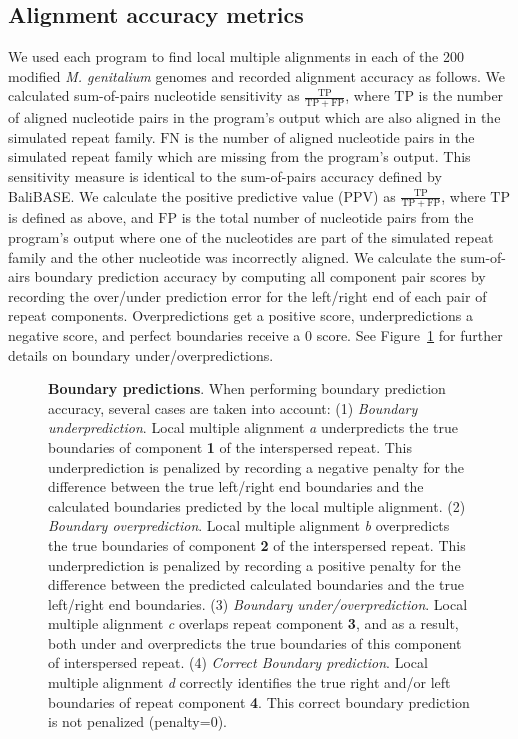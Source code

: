 \documentclass{llncs}
\begin{document}
\subsection{Alignment accuracy metrics}
\label{sec:metrics}
We used each program to find local multiple alignments in each of the
200 modified \emph{M. genitalium} genomes and recorded alignment
accuracy as follows. We calculated sum-of-pairs nucleotide sensitivity
as $\frac{\mathrm{TP}}{\mathrm{TP} + \mathrm{FP}}$, where
$\mathrm{TP}$ is the number of aligned nucleotide pairs in the
program's output which are also aligned in the simulated repeat
family.  $\mathrm{FN}$ is the number of aligned nucleotide pairs in
the simulated repeat family which are missing from the program's
output.  This sensitivity measure is identical to the sum-of-pairs
accuracy defined by BaliBASE\cite{ref-balibase}.  We calculate the
positive predictive value (PPV) as $\frac{\mathrm{TP}}{\mathrm{TP} +
\mathrm{FP}}$, where $\mathrm{TP}$ is defined as above, and
$\mathrm{FP}$ is the total number of nucleotide pairs from the
program's output where one of the nucleotides are part of the
simulated repeat family and the other nucleotide was incorrectly
aligned. We calculate the sum-of-airs boundary prediction accuracy by
computing all component pair scores by recording the over/under prediction
error for the left/right end of each pair of repeat components. Overpredictions get a positive score, underpredictions
a negative score, and perfect boundaries receive a 0 score. See Figure~\ref{fig-overunder} for
further details on boundary under/overpredictions.

\begin{figure}[t]
\centering
{}
\caption{\textbf{Boundary predictions}. When performing boundary prediction accuracy, several cases are
taken into account: (1) \emph{Boundary underprediction}. Local multiple alignment \emph{a} underpredicts the true boundaries
of component \textbf{1} of the interspersed repeat. This underprediction is penalized by recording a negative penalty for the difference
between the true left/right end boundaries and the calculated boundaries predicted by the local multiple alignment. (2) \emph{Boundary overprediction}. Local multiple alignment \emph{b} overpredicts the true boundaries of component \textbf{2} of the interspersed repeat. This underprediction is penalized by recording a positive penalty for the difference between the predicted calculated boundaries and the true left/right end boundaries. (3) \emph{Boundary under/overprediction}. Local multiple alignment \emph{c} overlaps repeat component \textbf{3}, and as a result, both under and overpredicts the true boundaries of this component of interspersed repeat. (4) \emph{Correct Boundary prediction}. Local multiple alignment \emph{d} correctly identifies the true right and/or left boundaries of repeat component \textbf{4}. This correct boundary prediction is not penalized (penalty=0).  }
\label{fig-overunder}
\end{figure}
\end{document}
